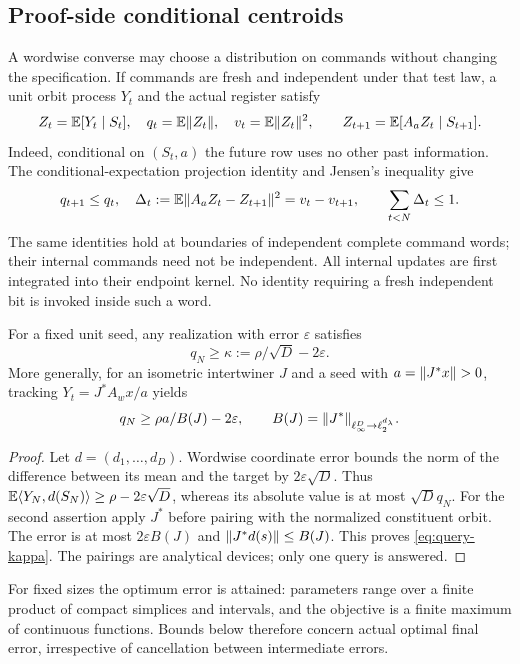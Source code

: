 \subsection{Proof-side conditional centroids}
A wordwise converse may choose a distribution on commands without changing the specification. If commands are fresh and independent under that test law, a unit orbit process $Y_t$ and the actual register satisfy
\begin{equation}\label{eq:centroids}
 Z_t=\mathbb E[Y_t\mid S_t],\quad q_t=\mathbb E\lVert Z_t\rVert,\quad
 v_t=\mathbb E\lVert Z_t\rVert^2,\qquad
 Z_{t+1}=\mathbb E[A_aZ_t\mid S_{t+1}].
\end{equation}
Indeed, conditional on $(S_t,a)$ the future row uses no other past information. The conditional-expectation projection identity and Jensen's inequality give
\begin{equation}\label{eq:conditional}
 q_{t+1}\le q_t,\quad
 \Delta_t:=\mathbb E\lVert A_aZ_t-Z_{t+1}\rVert^2=v_t-v_{t+1},
 \qquad \sum_{t<N}\Delta_t\le1.
\end{equation}
The same identities hold at boundaries of independent complete command words; their internal commands need not be independent. All internal updates are first integrated into their endpoint kernel. No identity requiring a fresh independent bit is invoked inside such a word.

\begin{lemma}\label{lem:terminal}
For a fixed unit seed, any realization with error $\varepsilon$ satisfies
\begin{equation}\label{eq:kappa}
 q_N\ge\kappa:=\rho/\sqrt D-2\varepsilon.
\end{equation}
More generally, for an isometric intertwiner $J$ and a seed with $a=\lVert J^*x\rVert>0$, tracking $Y_t=J^*A_wx/a$ yields
\begin{equation}\label{eq:query-kappa}
 q_N\ge \rho a/B(J)-2\varepsilon,
 \qquad B(J)=\lVert J^*\rVert_{\ell_\infty^D\to\ell_2^{d_\lambda}}.
\end{equation}
\end{lemma}
\begin{proof}
Let $d=(d_1,\ldots,d_D)$. Wordwise coordinate error bounds the norm of the difference between its mean and the target by $2\varepsilon\sqrt D$. Thus $\mathbb E\langle Y_N,d(S_N)\rangle\ge\rho-2\varepsilon\sqrt D$, whereas its absolute value is at most $\sqrt D q_N$. For the second assertion apply $J^*$ before pairing with the normalized constituent orbit. The error is at most $2\varepsilon B(J)$ and $\lVert J^*d(s)\rVert\le B(J)$. This proves \eqref{eq:query-kappa}. The pairings are analytical devices; only one query is answered.
\end{proof}

For fixed sizes the optimum error is attained: parameters range over a finite product of compact simplices and intervals, and the objective is a finite maximum of continuous functions. Bounds below therefore concern actual optimal final error, irrespective of cancellation between intermediate errors.
